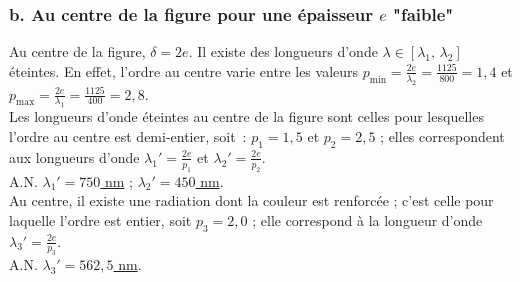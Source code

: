\documentclass{article}
\begin{document}
\subsubsection*{b. Au centre de la figure pour une épaisseur $e$
"faible"} Au centre de la figure, $\delta = 2e$. Il existe
des longueurs d'onde $\lambda \in \left[\lambda_{1},\, \lambda_{2}\right]$
éteintes. En effet, l'ordre au centre varie entre les valeurs
$p_{\mathrm{min}} = \frac{2e}{\lambda_{2}} = \frac{1125}{800} = 1,4$ et
$p_{\mathrm{max}} = \frac{2e}{\lambda_{1}} = \frac{1125}{400} = 2,8$. \\
Les longueurs d'onde éteintes au centre de la figure sont celles
pour lesquelles l'ordre au centre est demi-entier, soit : $p_{1} =
1,5$ et $p_{2} = 2,5$ ; elles correspondent aux longueurs d'onde
$\lambda_{1}' = \frac{2e}{p_{1}}$ et $\lambda_{2}' =
\frac{2e}{p_{2}}$. \\
A.N. \underline{$\lambda_{1}' = 750$ nm} ; \underline{$\lambda_{2}'
= 450$ nm}. \\
Au centre, il existe une radiation dont la couleur est renforcée ;
c'est celle pour laquelle l'ordre est entier, soit $p_{3} = 2,0$ ;
elle correspond à la longueur d'onde $\lambda_{3}' =
\frac{2e}{p_{3}}$. \\
A.N. \underline{$\lambda_{3}' = 562,5$ nm}.
\end{document}

